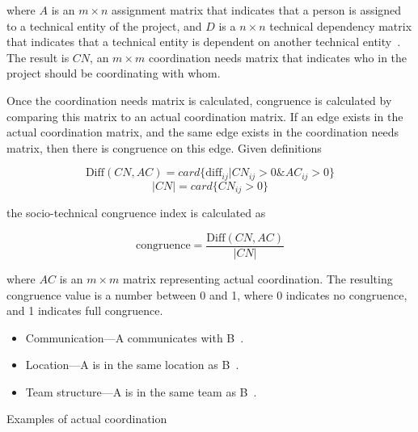 \noindent where $A$ is an $m \times n$ assignment matrix that indicates that a person is assigned to a technical entity of the project, and $D$ is a $n \times n$ technical dependency matrix that indicates that a technical entity is dependent on another technical entity~\cite{cataldo:cscw:2006}. The result is $CN$, an $m \times m$ coordination needs matrix that indicates who in the project should be coordinating with whom.


Once the coordination needs matrix is calculated, congruence is calculated by comparing this matrix to an actual coordination matrix. If an edge exists in the actual coordination matrix, and the same edge exists in the coordination needs matrix, then there is congruence on this edge. Given definitions


\[ \text{Diff}(CN, AC) = card\{ \text{diff}_{ij} | CN_{ij} > 0 \& AC_{ij} > 0 \} \]
\[|CN| = card \{ CN_{ij} > 0 \} \]

\noindent the socio-technical congruence index is calculated as~\cite{cataldo:esem:2008}

\[ \text{congruence} = \frac{\text{Diff}(CN, AC)}  {|CN|} \]

\noindent where $AC$ is an $m \times m$ matrix representing actual coordination. The resulting congruence value is a number between 0 and 1, where 0 indicates no congruence, and 1 indicates full congruence.


\begin{placeholder}[t]
\begin{itemize}
\item Communication---A communicates with B~\cite{cataldo:cscw:2006, ehrlich2008:gaps, cataldo:esem:2008,damian2007:collaboration}.
\item Location---A is in the same location as B~\cite{cataldo:cscw:2006, ehrlich2008:gaps}.
\item Team structure---A is in the same team as B~\cite{cataldo:cscw:2006}.
\end{itemize}
\caption{Examples of actual coordination}
\label{ph:relationships}
\end{placeholder}

